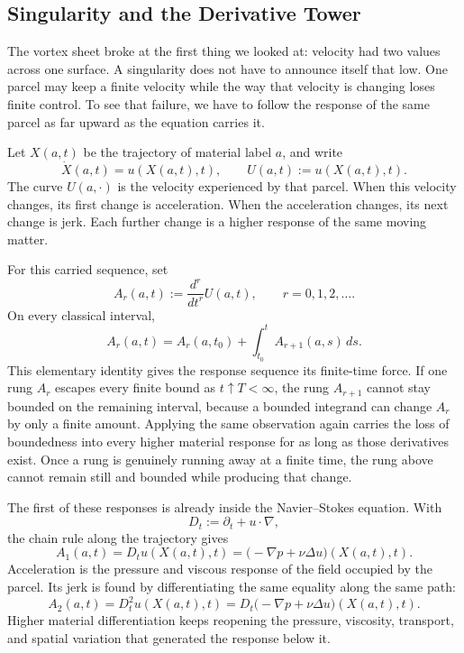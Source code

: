 \subsection{Singularity and the Derivative Tower}\label{sub:SingularityAndTheDerivativeTower}

The vortex sheet broke at the first thing we looked at: velocity had two values across one surface.
A singularity does not have to announce itself that low.
One parcel may keep a finite velocity while the way that velocity is changing loses finite control.
To see that failure, we have to follow the response of the same parcel as far upward as the equation carries it.

Let \(X(a,t)\) be the trajectory of material label \(a\), and write
\[
  \dot X(a,t)=u(X(a,t),t),
  \qquad
  U(a,t):=u(X(a,t),t).
\]
The curve \(U(a,\cdot)\) is the velocity experienced by that parcel.
When this velocity changes, its first change is acceleration.
When the acceleration changes, its next change is jerk.
Each further change is a higher response of the same moving matter.

For this carried sequence, set
\[
  A_r(a,t)
  :=
  \frac{d^r}{dt^r}U(a,t),
  \qquad
  r=0,1,2,\ldots.
\]
On every classical interval,
\[
  A_r(a,t)
  =
  A_r(a,t_0)
  +
  \int_{t_0}^{t}A_{r+1}(a,s)\,ds.
\]
This elementary identity gives the response sequence its finite-time force.
If one rung \(A_r\) escapes every finite bound as \(t\uparrow T<\infty\), the rung \(A_{r+1}\) cannot stay bounded on the remaining interval, because a bounded integrand can change \(A_r\) by only a finite amount.
Applying the same observation again carries the loss of boundedness into every higher material response for as long as those derivatives exist.
Once a rung is genuinely running away at a finite time, the rung above cannot remain still and bounded while producing that change.

The first of these responses is already inside the Navier--Stokes equation.
With
\[
  D_t:=\partial_t+u\cdot\nabla,
\]
the chain rule along the trajectory gives
\[
  A_1(a,t)
  =
  D_tu(X(a,t),t)
  =
  \bigl(-\nabla p+\nu\Delta u\bigr)(X(a,t),t).
\]
Acceleration is the pressure and viscous response of the field occupied by the parcel.
Its jerk is found by differentiating the same equality along the same path:
\[
  A_2(a,t)
  =
  D_t^2u(X(a,t),t)
  =
  D_t\bigl(-\nabla p+\nu\Delta u\bigr)(X(a,t),t).
\]
Higher material differentiation keeps reopening the pressure, viscosity, transport, and spatial variation that generated the response below it.

